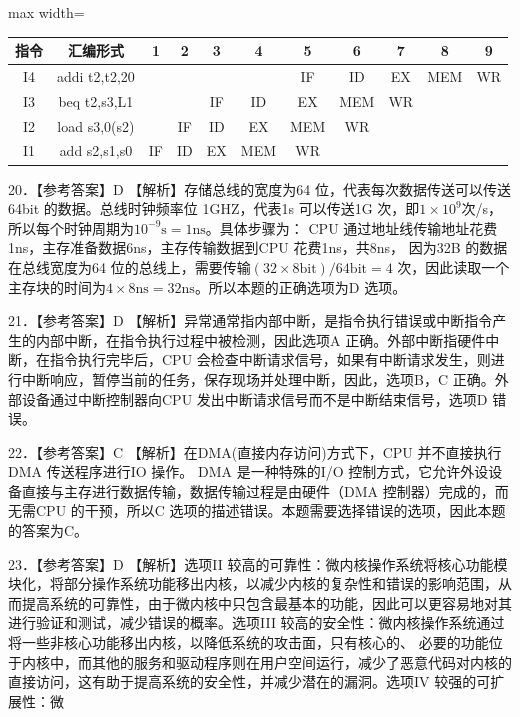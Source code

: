 \documentclass[UTF8,11pt]{ctexart}
\begin{document}
\begin{center}\begin{adjustbox}{max width=\linewidth}\begin{tabular}{|c|c|c|c|c|c|c|c|c|c|c|}\hline
指令 & 汇编形式 & 1 & 2 & 3 & 4 & 5 & 6 & 7 & 8 & 9\\\hline
I4 & addi t2,t2,20 &  &  &  &  & IF & ID & EX & MEM & WR\\\hline
I3 & beq t2,s3,L1 &  &  & IF & ID & EX & MEM & WR &  & \\\hline
I2 & load s3,0(s2) &  & IF & ID & EX & MEM & WR &  &  & \\\hline
I1 & add s2,s1,s0 & IF & ID & EX & MEM & WR &  &  &  & \\\hline\end{tabular}\end{adjustbox}\end{center}

20．【参考答案】D 【解析】存储总线的宽度为64 位，代表每次数据传送可以传送64bit 的数据。总线时钟频率位 1GHZ，代表1s 可以传送1G 次，即\(\displaystyle 1\times10^9\)次/s，所以每个时钟周期为\(\displaystyle 10^{-9}\mathrm{s}=1\mathrm{ns}\)。具体步骤为： CPU 通过地址线传输地址花费1ns，主存准备数据6ns，主存传输数据到CPU 花费1ns，共8ns， 因为32B 的数据在总线宽度为64 位的总线上，需要传输\(\displaystyle (32\times8\mathrm{bit})/64\mathrm{bit}=4\) 次，因此读取一个主存块的时间为\(\displaystyle 4\times8\mathrm{ns}=32\mathrm{ns}\)。所以本题的正确选项为D 选项。


21．【参考答案】D 【解析】异常通常指内部中断，是指令执行错误或中断指令产生的内部中断，在指令执行过程中被检测，因此选项A 正确。外部中断指硬件中断，在指令执行完毕后，CPU 会检查中断请求信号，如果有中断请求发生，则进行中断响应，暂停当前的任务，保存现场并处理中断，因此，选项B，C 正确。外部设备通过中断控制器向CPU 发出中断请求信号而不是中断结束信号，选项D 错误。


22．【参考答案】C 【解析】在DMA(直接内存访问)方式下，CPU 并不直接执行DMA 传送程序进行IO 操作。 DMA 是一种特殊的I/O 控制方式，它允许外设设备直接与主存进行数据传输，数据传输过程是由硬件（DMA 控制器）完成的，而无需CPU 的干预，所以C 选项的描述错误。本题需要选择错误的选项，因此本题的答案为C。


23．【参考答案】D 【解析】选项II 较高的可靠性：微内核操作系统将核心功能模块化，将部分操作系统功能移出内核，以减少内核的复杂性和错误的影响范围，从而提高系统的可靠性，由于微内核中只包含最基本的功能，因此可以更容易地对其进行验证和测试，减少错误的概率。选项III 较高的安全性：微内核操作系统通过将一些非核心功能移出内核，以降低系统的攻击面，只有核心的、 必要的功能位于内核中，而其他的服务和驱动程序则在用户空间运行，减少了恶意代码对内核的直接访问，这有助于提高系统的安全性，并减少潜在的漏洞。选项IV 较强的可扩展性：微
\end{document}
